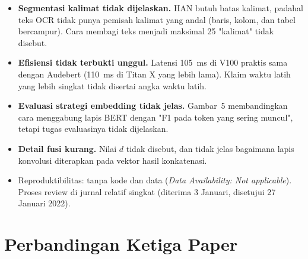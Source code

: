 \begin{itemize}
        tanpa P/R/F1, tanpa tabel pembanding, dan tanpa penjelasan cara transfer dari
        16 kelas RVL-CDIP ke 10 kelas Tobacco3482.
  \item \textbf{Segmentasi kalimat tidak dijelaskan.} HAN butuh batas kalimat, padahal
        teks OCR tidak punya pemisah kalimat yang andal (baris, kolom, dan tabel
        bercampur). Cara membagi teks menjadi maksimal 25 "kalimat" tidak disebut.
  \item \textbf{Efisiensi tidak terbukti unggul.} Latensi 105~ms di V100 praktis sama
        dengan Audebert (110~ms di Titan X yang lebih lama). Klaim waktu latih yang lebih
        singkat tidak disertai angka waktu latih.
  \item \textbf{Evaluasi strategi embedding tidak jelas.} Gambar~5 membandingkan cara
        menggabung lapis BERT dengan "F1 pada token yang sering muncul", tetapi tugas
        evaluasinya tidak dijelaskan.
  \item \textbf{Detail fusi kurang.} Nilai $d$ tidak disebut, dan tidak jelas bagaimana
        lapis konvolusi diterapkan pada vektor hasil konkatenasi.
  \item Reproduktibilitas: tanpa kode dan data (\emph{Data Availability: Not applicable}).
        Proses review di jurnal relatif singkat (diterima 3 Januari, disetujui 27 Januari
        2022).
\end{itemize}

\section{Perbandingan Ketiga Paper}\label{sec:banding}


